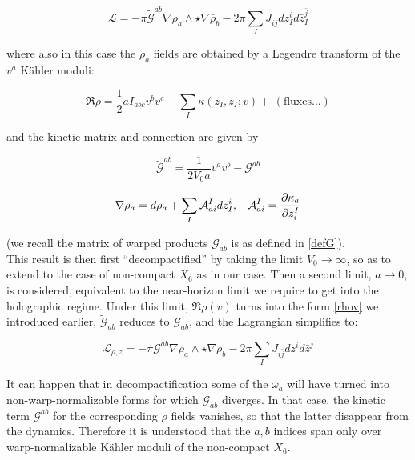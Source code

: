 \begin{equation}
	\mathcal{L} = - \pi \tilde{\mathcal{G}}^{ab} \nabla \rho_a \wedge \star \nabla \bar\rho_b - 2\pi \sum_I J_{i\bar{j}} dz_I^i d\bar z_I^{\bar j}
	\label{}
\end{equation}

where also in this case the $\rho_a$ fields are obtained by a Legendre transform of the $v^a$ K\"ahler moduli:

\begin{equation}
	\Re \rho  = \frac{1}{2} a I_{abc} v^b v^c + \sum_I \kappa(z_I,\bar z_I; v) + \, (\text{fluxes}\ldots)
	\label{}
\end{equation}

and the kinetic matrix and connection are given by

\begin{equation}
	\tilde{\mathcal{G}}^{ab} = \frac{1}{2V_0 a} v^a v^b - \mathcal{G}^{ab}
	\label{}
\end{equation}

\begin{align}
	\nabla \rho_a = d\rho_a + \sum_I \mathcal{A}^I_{ai} dz_I^i, && \mathcal{A}^I_{ai} = \frac{\partial\kappa_a}{\partial z^I_i}
	\label{}
\end{align}

(we recall the matrix of warped products $\mathcal{G}_{ab}$ is as defined in \ref{defG}).\\

This result is then first ``decompactified'' by taking the limit $V_0 \rightarrow \infty$, so as to extend to the case of non-compact $X_6$ as in our case. Then a second limit, $a \rightarrow 0$, is considered, equivalent to the near-horizon limit we require to get into the holographic regime. Under this limit, $\Re \rho(v)$ turns into the form \ref{rhov} we introduced earlier, $\tilde{\mathcal{G}}_{ab}$ reduces to $\mathcal{G}_{ab}$, and the Lagrangian simplifies to:

\begin{equation}
	\mathcal{L}_{\rho,z} = - \pi \mathcal{G}^{ab} \nabla \rho_a \wedge \star \nabla \rho_b - 2\pi \sum_I J_{i\bar j} dz^i d\bar z^j
	\label{}
\end{equation}

It can happen that in decompactification some of the $\omega_a$ will have turned into non-warp-normalizable forms for which $\mathcal{G}_{ab}$ diverges. In that case, the kinetic term $\mathcal{G}^{ab}$ for the corresponding $\rho$ fields vanishes, so that the latter disappear from the dynamics. Therefore it is understood that the $a,b$ indices span only over warp-normalizable K\"ahler moduli of the non-compact $X_6$.\\

